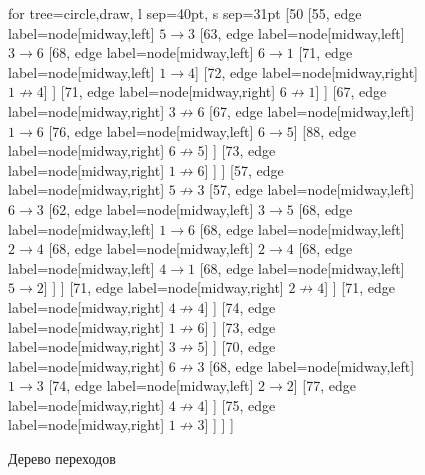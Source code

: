 \begin{figure}[H]
\begin{center}
	\begin{forest}
	for tree={circle,draw, l sep=40pt, s sep=31pt}
	[50 
		[55, edge label={node[midway,left] {$5 \rightarrow 3$}}  
			[63, edge label={node[midway,left] {$3 \rightarrow 6$}} 
				[68, edge label={node[midway,left] {$6 \rightarrow 1$}}
					[71, edge label={node[midway,left] {$1 \rightarrow 4$}}]
					[72, edge label={node[midway,right] {$1 \not\rightarrow 4$}}]
				]
				[71, edge label={node[midway,right] {$6 \not\rightarrow 1$}}]
			] 
			[67, edge label={node[midway,right] {$3 \not\rightarrow 6$}}
				[67, edge label={node[midway,left] {$1 \rightarrow 6$}}
					[76, edge label={node[midway,left] {$6 \rightarrow 5$}}]
					[88, edge label={node[midway,right] {$6 \not\rightarrow 5$}}]
				]
				[73, edge label={node[midway,right] {$1 \not\rightarrow 6$}}]
			] 
		]
		[57, edge label={node[midway,right] {$5 \not\rightarrow 3$}}
			[57, edge label={node[midway,left] {$6 \rightarrow 3$}}
				[62, edge label={node[midway,left] {$3 \rightarrow 5$}}
					[68, edge label={node[midway,left] {$1 \rightarrow 6$}}
						[68, edge label={node[midway,left] {$2 \rightarrow 4$}}
							[68, edge label={node[midway,left] {$2 \rightarrow 4$}}
								[68, edge label={node[midway,left] {$4 \rightarrow 1$}}
									[68, edge label={node[midway,left] {$5 \rightarrow 2$}}]								
								]
							]
							[71, edge label={node[midway,right] {$2 \not\rightarrow 4$}}]
						]
						[71, edge label={node[midway,right] {$4 \not\rightarrow 4$}}]
					]
					[74, edge label={node[midway,right] {$1 \not\rightarrow 6$}}]
				]
				[73, edge label={node[midway,right] {$3 \not\rightarrow 5$}}]
			]
			[70, edge label={node[midway,right] {$6 \not\rightarrow 3$}}
				[68, edge label={node[midway,left] {$1 \rightarrow 3$}}
					[74, edge label={node[midway,left] {$2 \rightarrow 2$}}]
					[77, edge label={node[midway,right] {$4 \not\rightarrow 4$}}]
				]
				[75, edge label={node[midway,right] {$1 \not\rightarrow 3$}}]
			]
		]
	]
	\end{forest}
	\caption{Дерево переходов}
	\label{pic:graph}
\end{center}
\end{figure}


